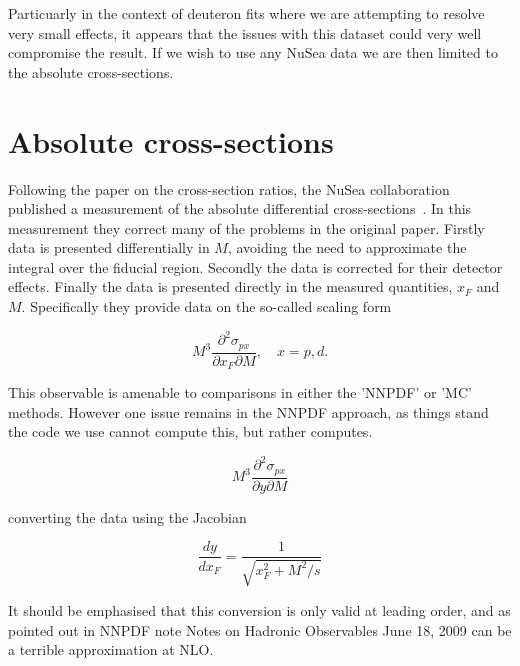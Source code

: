 \documentclass[11pt]{article}
\newcommand{\be}{\begin{equation}}
\newcommand{\ee}{\end{equation}}
\begin{document}
Particuarly in the context of deuteron fits where we are attempting to resolve very small effects, it appears that the
issues with this dataset could very well compromise the result. If we wish to use any NuSea data we are then limited to the absolute cross-sections.

\section{Absolute cross-sections}
Following the paper on the cross-section ratios, the NuSea collaboration published a measurement of the absolute differential cross-sections~\cite{Webb:2003ps}.
In this measurement they correct many of the problems in the original paper. Firstly data is presented differentially in $M$, avoiding the need to approximate
the integral over the fiducial region. Secondly the data is corrected for their detector effects. Finally the data is presented directly in the measured quantities,
$x_F$ and $M$. Specifically they provide data on the so-called scaling form

\be M^3 \frac{\partial^2 \sigma_{px}}{\partial x_F \partial M}, \quad x = p,d.\ee

This observable is amenable to comparisons in either the 'NNPDF' or 'MC' methods. However one issue remains in the NNPDF approach, as things stand the code
we use cannot compute this, but rather computes.

\be M^3 \frac{\partial^2 \sigma_{px}}{\partial y \partial M} \ee

converting the data using the Jacobian

\be \frac{dy}{dx_F} = \frac{1}{\sqrt{x_F^2 + M^2/s}}\ee

It should be emphasised that this conversion is only valid at leading order, and as pointed out in NNPDF note Notes on Hadronic Observables June 18, 2009
can be a terrible approximation at NLO.
\end{document}
